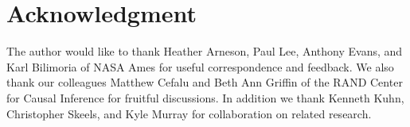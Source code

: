 \documentclass[conference]{IEEEtran}
\begin{document}







\section*{Acknowledgment}


The author would like to thank Heather Arneson, Paul Lee, Anthony Evans, and Karl Bilimoria of NASA Ames for useful correspondence and feedback.  We also thank our colleagues Matthew Cefalu and Beth Ann Griffin of the RAND Center for Causal Inference for fruitful discussions.  In addition we thank Kenneth Kuhn, Christopher Skeels, and Kyle Murray for collaboration on related research.










%
%
%
\vspace*{-35\baselineskip}
\end{document}
